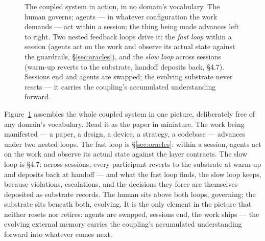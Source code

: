 \documentclass[11pt,a4paper,twocolumn]{article}
\begin{document}
\begin{figure}[t]
\caption{The coupled system in action, in no domain's vocabulary.
The human governs; agents --- in whatever configuration the work
demands --- act within a session; the thing being made advances
left to right. Two nested feedback loops drive it: the
\emph{fast loop} within a session (agents act on the work and
observe its actual state against the guardrails,
\S\ref{sec:oracles}), and the \emph{slow loop} across sessions
(warm-up reverts to the substrate, handoff deposits back, \S4.7).
Sessions end and agents are swapped; the evolving substrate never
resets --- it carries the coupling's accumulated understanding
forward.}
\label{fig:system}
\end{figure}

Figure~\ref{fig:system} assembles the whole coupled system in one
picture, deliberately free of any domain's vocabulary. Read it as
the paper in miniature. The work being manifested --- a paper, a
design, a device, a strategy, a codebase --- advances under two
nested loops. The fast loop is \S\ref{sec:oracles}: within a
session, agents act on the work and observe its actual state
against the layer contracts. The slow loop is \S4.7: across
sessions, every participant reverts to the substrate at warm-up
and deposits back at handoff --- and what the fast loop finds,
the slow loop keeps, because violations, escalations, and the
decisions they force are themselves deposited as substrate
records. The human sits above both loops, governing; the
substrate sits beneath both, evolving. It is the only element in
the picture that neither resets nor retires: agents are swapped,
sessions end, the work ships --- the evolving external memory
carries the coupling's accumulated understanding forward into
whatever comes next.
\end{document}
